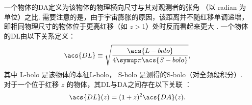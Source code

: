 一个物体的\acf{DA}定义为该物体的物理横向尺寸与其对观测者的张角
（以 \si{radian} 为单位）之比.
需要注意的是，由于宇宙膨胀的原因，该距离并不随红移单调递增，
即相同物理尺寸的物体位于更高红移（如 $z > 1$）处时反而看起来更大 \cite{hogg1999}.
一个物体的\acf{DL}由以下关系定义：
\begin{equation}
  \label{eq:dl-def}
  \acs{DL} \equiv \sqrt{\frac{\acs{L-bolo}}{4\Cpi \acs{S-bolo}}},
\end{equation}
其中 \acs{L-bolo} 是该物体的本征\acl{L-bolo}，
\acs{S-bolo} 是测得的\acl{S-bolo}（对全频段积分）.
对于一个位于红移 $z$ 的物体，其\acl{DL}与\acl{DA}之间存在以下关联
\cite{weinberg1972,hogg1999,ellis2007}：
\begin{equation}
  \label{eq:dl-da}
  \acs{DL}(z) = (1+z)^2 \acs{DA}(z).
\end{equation}


